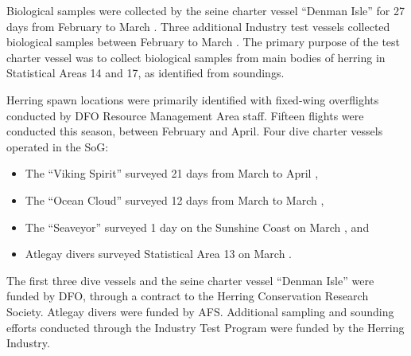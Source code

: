Biological samples were collected by the seine charter vessel ``Denman Isle'' for 27 days from February  to March .
Three additional Industry test vessels collected biological samples between February  to March .
The primary purpose of the test charter vessel was to collect biological samples from main bodies of herring in Statistical Areas 14 and 17, as identified from soundings.

Herring spawn locations were primarily identified with fixed-wing overflights conducted by DFO Resource Management Area staff.
Fifteen flights were conducted this season, between February and April.
Four dive charter vessels operated in the SoG:
\begin{itemize}
\item The ``Viking Spirit'' surveyed 21 days from March  to April , 
\item The ``Ocean Cloud'' surveyed 12 days from March  to March ,
\item The ``Seaveyor'' surveyed 1 day on the Sunshine Coast on March , and
\item Atlegay divers surveyed Statistical Area 13 on March .
\end{itemize}
The first three dive vessels and the seine charter vessel ``Denman Isle'' were funded by DFO, through a contract to the Herring Conservation Research Society.
Atlegay divers were funded by AFS.
Additional sampling and sounding efforts conducted through the Industry Test Program were funded by the Herring Industry.